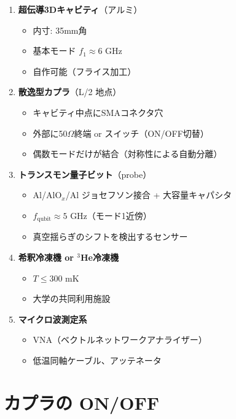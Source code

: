 \documentclass[12pt,a4paper]{article}
\begin{document}
\begin{expbox}[装置一覧]
\begin{enumerate}
\item \textbf{超伝導3Dキャビティ}（アルミ）
    \begin{itemize}
    \item 内寸: 35mm角
    \item 基本モード $f_1 \approx 6$ GHz
    \item 自作可能（フライス加工）
    \end{itemize}

\item \textbf{散逸型カプラ}（L/2 地点）
    \begin{itemize}
    \item キャビティ中点にSMAコネクタ穴
    \item 外部に50$\Omega$終端 or スイッチ（ON/OFF切替）
    \item 偶数モードだけが結合（対称性による自動分離）
    \end{itemize}

\item \textbf{トランスモン量子ビット}（probe）
    \begin{itemize}
    \item Al/AlO$_x$/Al ジョセフソン接合 + 大容量キャパシタ
    \item $f_{\mathrm{qubit}} \approx 5$ GHz（モード1近傍）
    \item 真空揺らぎのシフトを検出するセンサー
    \end{itemize}

\item \textbf{希釈冷凍機 or $^3$He冷凍機}
    \begin{itemize}
    \item $T \leq 300$ mK
    \item 大学の共同利用施設
    \end{itemize}

\item \textbf{マイクロ波測定系}
    \begin{itemize}
    \item VNA（ベクトルネットワークアナライザー）
    \item 低温同軸ケーブル、アッテネータ
    \end{itemize}
\end{enumerate}
\end{expbox}

\section{カプラの ON/OFF}
\end{document}
